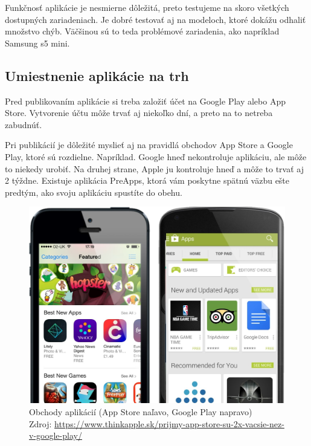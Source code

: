 \documentclass[10pt,twoside,slovak,a4paper]{article}
\begin{document}
Funkčnosť aplikácie je nesmierne dôležitá, preto testujeme na skoro všetkých dostupných zariadeniach. Je dobré testovať aj na modeloch, ktoré dokážu odhaliť množstvo chýb. Väčšinou sú to teda problémové zariadenia, ako napríklad Samsung s5 mini.

\cite{EMM2, buildfire, elite}



\subsection{Umiestnenie aplikácie na trh} \label{sec:Umiestnenie aplikácie na trh}
\quad Pred publikovaním aplikácie si treba založiť  účet na Google Play alebo App Store. Vytvorenie účtu môže trvať aj niekoľko dní, a preto na to netreba zabudnúť.

Pri publikácií je dôležité myslieť aj na pravidlá obchodov App Store a Google Play, ktoré sú rozdielne. Napríklad. Google hneď nekontroluje aplikáciu, ale môže to niekedy urobiť. Na druhej strane, Apple ju kontroluje hneď a môže to trvať aj 2 týždne. Existuje aplikácia PreApps, ktorá vám poskytne spätnú väzbu ešte predtým, ako svoju aplikáciu spustíte do obehu.

\begin{figure}[h!]
\includegraphics[scale=0.3]{obchod_aplikacii}
\centering
\caption{Obchody aplikácií (App Store naľavo, Google Play napravo) 
\\ Zdroj: \url{https://www.thinkapple.sk/prijmy-app-store-su-2x-vacsie-nez-v-google-play/}}
\end{figure}
\end{document}

